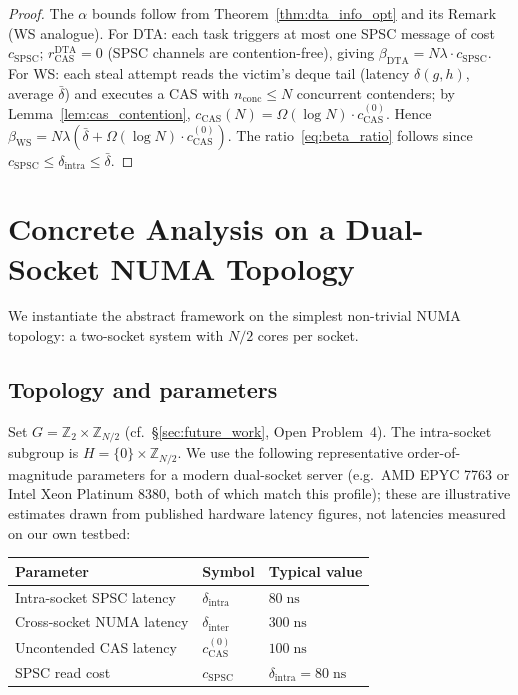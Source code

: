 \documentclass[11pt,a4paper]{article}
\begin{document}
\begin{proof}
The $\alpha$ bounds follow from Theorem~\ref{thm:dta_info_opt} and its
Remark (WS analogue).
For DTA: each task triggers at most one SPSC message of cost $c_{\mathrm{SPSC}}$;
$r_{\mathrm{CAS}}^\mathrm{DTA} = 0$ (SPSC channels are contention-free), giving
$\beta_{\mathrm{DTA}} = N\lambda \cdot c_{\mathrm{SPSC}}$.
For WS: each steal attempt reads the victim's deque tail (latency $\delta(g,h)$,
average $\bar\delta$) and executes a CAS with $n_{\mathrm{conc}} \leq N$
concurrent contenders; by Lemma~\ref{lem:cas_contention},
$c_{\mathrm{CAS}}(N) = \Omega(\log N)\cdot c_{\mathrm{CAS}}^{(0)}$.
Hence $\beta_{\mathrm{WS}} = N\lambda(\bar\delta + \Omega(\log N)\cdot c_{\mathrm{CAS}}^{(0)})$.
The ratio~\eqref{eq:beta_ratio} follows since $c_{\mathrm{SPSC}} \leq \delta_{\mathrm{intra}} \leq \bar\delta$.
\end{proof}

\section{Concrete Analysis on a Dual-Socket NUMA Topology}
\label{sec:numa_concrete}

We instantiate the abstract framework on the simplest non-trivial NUMA
topology: a two-socket system with $N/2$ cores per socket.

\subsection{Topology and parameters}

Set $G = \mathbb{Z}_2 \times \mathbb{Z}_{N/2}$ (cf.~\S\ref{sec:future_work},
Open Problem~4).  The intra-socket subgroup is
$H = \{0\} \times \mathbb{Z}_{N/2}$.  We use the following representative
order-of-magnitude parameters for a modern dual-socket server (e.g.\
AMD EPYC 7763 or Intel Xeon Platinum 8380, both of which match this
profile); these are illustrative estimates drawn from published
hardware latency figures, not latencies measured on our own testbed:
\begin{center}
\begin{tabular}{lll}
\toprule
Parameter & Symbol & Typical value \\
\midrule
Intra-socket SPSC latency & $\delta_{\mathrm{intra}}$ & $80\;\mathrm{ns}$ \\
Cross-socket NUMA latency & $\delta_{\mathrm{inter}}$ & $300\;\mathrm{ns}$ \\
Uncontended CAS latency   & $c_{\mathrm{CAS}}^{(0)}$ & $100\;\mathrm{ns}$ \\
SPSC read cost            & $c_{\mathrm{SPSC}}$       & $\delta_{\mathrm{intra}} = 80\;\mathrm{ns}$ \\
\bottomrule
\end{tabular}
\end{center}
\end{document}
